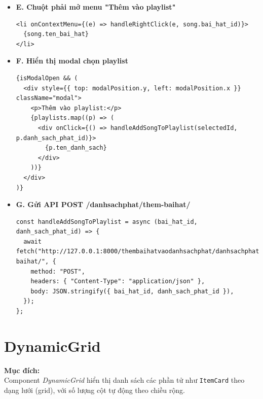 \begin{enumerate}
\begin{itemize}
  \item \textbf{E. Chuột phải mở menu "Thêm vào playlist"}
\begin{verbatim}
<li onContextMenu={(e) => handleRightClick(e, song.bai_hat_id)}>
  {song.ten_bai_hat}
</li>
\end{verbatim}

  \item \textbf{F. Hiển thị modal chọn playlist}
\begin{verbatim}
{isModalOpen && (
  <div style={{ top: modalPosition.y, left: modalPosition.x }} className="modal">
    <p>Thêm vào playlist:</p>
    {playlists.map((p) => (
      <div onClick={() => handleAddSongToPlaylist(selectedId, p.danh_sach_phat_id)}>
        {p.ten_danh_sach}
      </div>
    ))}
  </div>
)}
\end{verbatim}

  \item \textbf{G. Gửi API POST /danhsachphat/them-baihat/}
\begin{verbatim}
const handleAddSongToPlaylist = async (bai_hat_id, danh_sach_phat_id) => {
  await fetch("http://127.0.0.1:8000/thembaihatvaodanhsachphat/danhsachphat/them-baihat/", {
    method: "POST",
    headers: { "Content-Type": "application/json" },
    body: JSON.stringify({ bai_hat_id, danh_sach_phat_id }),
  });
};
\end{verbatim}
\end{itemize}
\end{enumerate}


\section{DynamicGrid}

\textbf{Mục đích:} \\
Component \textit{DynamicGrid} hiển thị danh sách các phần tử như \texttt{ItemCard} theo dạng lưới (grid), với số lượng cột tự động theo chiều rộng.

